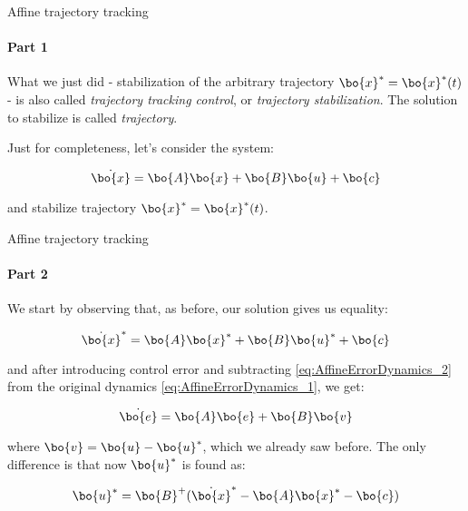 \documentclass{beamer}
\begin{document}
\begin{frame}{Affine trajectory tracking}
\framesubtitle{Part 1}
\begin{flushleft}

What we just did - stabilization of the arbitrary trajectory $\bo{x}^* = \bo{x}^*(t)$ - is also called \emph{trajectory tracking control}, or \emph{trajectory stabilization}. The solution to stabilize is called \emph{trajectory}.

\bigskip

Just for completeness, let's consider the system:

\begin{equation}
\label{eq:AffineErrorDynamics_1}
    \dot{\bo{x}} = \bo{A}\bo{x} + \bo{B}\bo{u} + \bo{c}
\end{equation}

and stabilize trajectory $\bo{x}^* = \bo{x}^*(t)$.

\end{flushleft}
\end{frame}




\begin{frame}{Affine trajectory tracking}
\framesubtitle{Part 2}
\begin{flushleft}

We start by observing that, as before, our solution gives us equality:

\begin{equation}
\label{eq:AffineErrorDynamics_2}
    \dot{\bo{x}}^* = \bo{A}\bo{x}^* + \bo{B}\bo{u}^* + \bo{c}
\end{equation}

and after introducing control error and subtracting \eqref{eq:AffineErrorDynamics_2} from the original dynamics \eqref{eq:AffineErrorDynamics_1}, we get:

\begin{equation}
    \dot{\bo{e}} = \bo{A}\bo{e} + \bo{B}\bo{v}
\end{equation}

where $\bo{v} = \bo{u} - \bo{u}^*$, which we already saw before. The only difference is that now $\bo{u}^*$ is found as:

\begin{equation}
    \bo{u}^* = \bo{B}^+(\dot{\bo{x}}^* - \bo{A}\bo{x}^* - \bo{c})
\end{equation}

\end{flushleft}
\end{frame}
\end{document}
